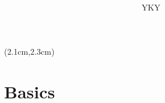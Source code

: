 \newcommand{\logic}[1]{{\color{violet}{\textit{#1}}}}
\newcommand{\underconst}{\texttt{[image: ../2020/UnderConst.png]}}
\newcommand{\KBsymbol}{\vcenter{\hbox{\texttt{[image: ../KB-symbol.png]}}}}
\newcommand{\token}{\vcenter{\hbox{\texttt{[image: token.png]}}}}
\newcommand{\proposition}{\vcenter{\hbox{\texttt{[image: proposition.png]}}}}


	
\begin{preview}

\title{\vspace{-1.5cm} \bfseries\color{blue}{\LARGE AGI from the perspective of\\
		categorical logic}}

\author{YKY} %

\maketitle

\setcounter{section}{-1}
\setcounter{mypage}{0}

\begin{textblock*}{5cm}(2.1cm,2.3cm) %
	{\color{red}{\large \textcircled{\small \themypage}}}
	\addtocounter{mypage}{1}
\end{textblock*}

\begin{minipage}{\textwidth}
	\setlength{\parskip}{0.4\baselineskip}
			
\section{Basics}


\end{minipage}
\end{preview}
